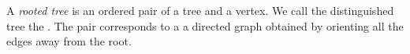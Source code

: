 
\sbasic







\sstart
{}



A \emph{rooted tree}
is an ordered pair of
a tree and a vertex.
We call the
distinguished tree
the .
The pair corresponds to a
a directed graph obtained by
orienting all the edges away
from the root.
\strats
